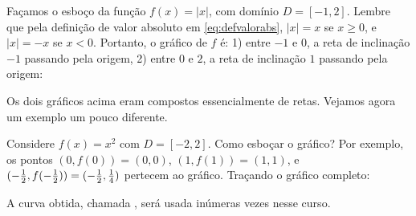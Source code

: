 \begin{ex}
Façamos o esboço da função $f(x)=|x|$, com domínio $D=[-1,2]$. Lembre
que pela definição de valor absoluto em \eqref{eq:defvalorabs},
$|x|=x$ se $x\geq 0$, e $|x|=-x$ se $x<0$.
Portanto, o gráfico de $f$ é: 1) entre $-1$ e $0$, a reta de
inclinação $-1$ passando pela origem, 2) entre $0$ e $2$, a reta de
inclinação $1$ passando pela origem:
\begin{center}
\begin{bmlimage}\end{bmlimage}
\end{center}
\end{ex}

Os dois gráficos acima eram compostos essencialmente de retas. Vejamos agora um exemplo
um pouco diferente.

\begin{ex}\label{Ex:Grafxdois}
Considere $f(x)=x^2$ com $D=[-2,2]$. Como esboçar o gráfico? Por exemplo,
os pontos $(0,f(0))=(0,0)$, $(1,f(1))=(1,1)$, e $(-\frac{1}{2},f(-\frac{1}{2}))=(-\frac{1}{2},\tfrac14)$
pertecem ao gráfico. Traçando o gráfico completo:
\begin{center}
\begin{bmlimage}\end{bmlimage}
\end{center}
A curva obtida, chamada , será usada inúmeras vezes nesse
curso.
\end{ex}

